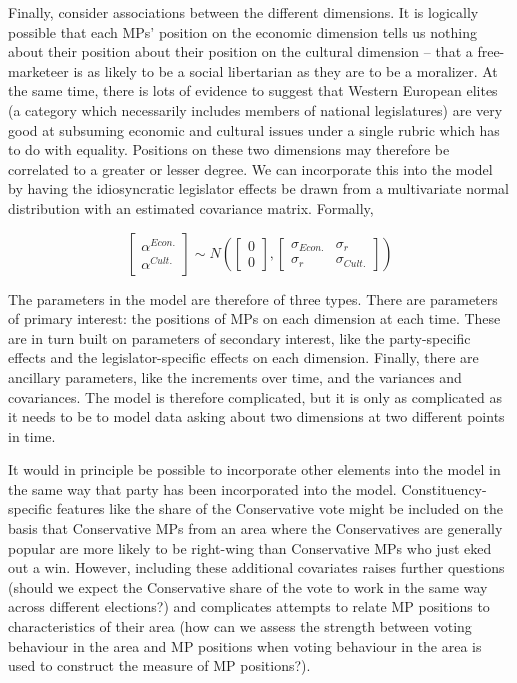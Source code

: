 \documentclass[
]{article}
\begin{document}
Finally, consider associations between the different dimensions. It is
logically possible that each MPs' position on the economic dimension
tells us nothing about their position about their position on the
cultural dimension -- that a free-marketeer is as likely to be a social
libertarian as they are to be a moralizer. At the same time, there is
lots of evidence to suggest that Western European elites (a category
which necessarily includes members of national legislatures) are very
good at subsuming economic and cultural issues under a single rubric
which has to do with equality. Positions on these two dimensions may
therefore be correlated to a greater or lesser degree. We can
incorporate this into the model by having the idiosyncratic legislator
effects be drawn from a multivariate normal distribution with an
estimated covariance matrix. Formally,

\[
\begin{bmatrix}
\alpha^{Econ.} \\
\alpha^{Cult.}
\end{bmatrix} \sim
N\left(
\begin{bmatrix}
0 \\
0 
\end{bmatrix},
\begin{bmatrix}
\sigma_{Econ.} & \sigma_r \\
\sigma_r & \sigma_{Cult.}
\end{bmatrix}
\right)
\]

The parameters in the model are therefore of three types. There are
parameters of primary interest: the positions of MPs on each dimension
at each time. These are in turn built on parameters of secondary
interest, like the party-specific effects and the legislator-specific
effects on each dimension. Finally, there are ancillary parameters, like
the increments over time, and the variances and covariances. The model
is therefore complicated, but it is only as complicated as it needs to
be to model data asking about two dimensions at two different points in
time.

It would in principle be possible to incorporate other elements into the
model in the same way that party has been incorporated into the model.
Constituency-specific features like the share of the Conservative vote
might be included on the basis that Conservative MPs from an area where
the Conservatives are generally popular are more likely to be right-wing
than Conservative MPs who just eked out a win. However, including these
additional covariates raises further questions (should we expect the
Conservative share of the vote to work in the same way across different
elections?) and complicates attempts to relate MP positions to
characteristics of their area (how can we assess the strength between
voting behaviour in the area and MP positions when voting behaviour in
the area is used to construct the measure of MP positions?).
\end{document}
